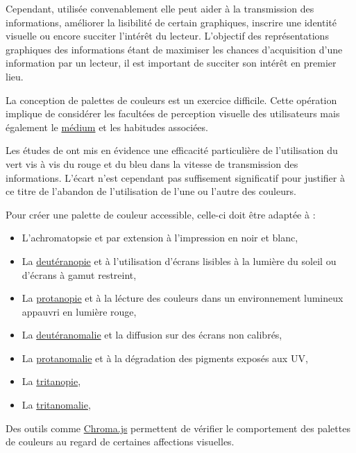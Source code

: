 \documentclass[a4paper,12pt]{article}
\begin{document}
\begin{multicols}{2}
Cependant, utilisée convenablement elle peut aider à la transmission des informations, améliorer la lisibilité de certain graphiques, inscrire une identité visuelle ou encore succiter l'intérêt du lecteur. L'objectif des représentations graphiques des informations étant de maximiser les chances d'acquisition d'une information par un lecteur, il est important de succiter son intérêt en premier lieu. \autocite{asiauniversitytaichungtaiwanResearchApplicationFunctiontechnologyaesthetics2020}

La conception de palettes de couleurs est un exercice difficile. Cette opération implique de considérer les facultées de perception visuelle des utilisateurs mais également le \protect\hyperlink{gls-12}{\label{gls-12-use-1}médium} et les habitudes associées.

Les études de \textcite{tranDiscoveringAccessibleData2024} ont mis en évidence une efficacité particulière de l'utilisation du vert vis à vis du rouge et du bleu dans la vitesse de transmission des informations. L'écart n'est cependant pas suffisement significatif pour justifier à ce titre de l'abandon de l'utilisation de l'une ou l'autre des couleurs.

Pour créer une palette de couleur accessible, celle-ci doit être adaptée à :
\begin{itemize}
\item L'achromatopsie et par extension à l'impression en noir et blanc,
\item La \protect\hyperlink{gls-13}{\label{gls-13-use-1}deutéranopie} et à l'utilisation d'écrans lisibles à la lumière du soleil ou d'écrans à gamut restreint,
\item La \protect\hyperlink{gls-14}{\label{gls-14-use-1}protanopie} et à la lécture des couleurs dans un environnement lumineux appauvri en lumière rouge,
\item La \protect\hyperlink{gls-15}{\label{gls-15-use-1}deutéranomalie} et la diffusion sur des écrans non calibrés,
\item La \protect\hyperlink{gls-16}{\label{gls-16-use-1}protanomalie} et à la dégradation des pigments exposés aux UV,
\item La \protect\hyperlink{gls-17}{\label{gls-17-use-1}tritanopie},
\item La \protect\hyperlink{gls-18}{\label{gls-18-use-1}tritanomalie},
\end{itemize}

Des outils comme \href{https://gka.github.io/palettes/\#/5|s|ce0072,96ffea,00ffad|ffffe0,ff005e,93003a|1|1}{Chroma.js} permettent de vérifier le comportement des palettes de couleurs au regard de certaines affections visuelles.


\end{multicols}
\end{document}
